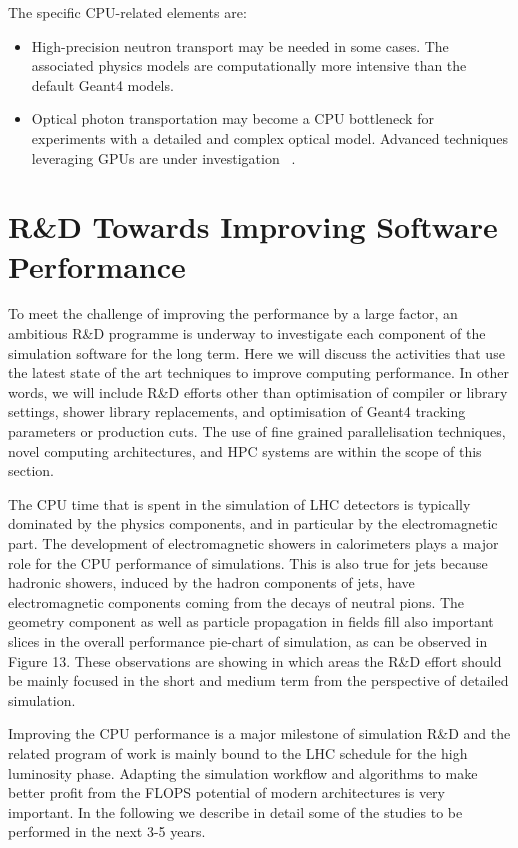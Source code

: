 \documentclass[12pt,a4paper]{article}
\begin{document}
{The specific CPU-related elements are:

\begin{itemize}
\item
  High-precision neutron transport may be needed in some cases. The
  associated physics models are computationally more intensive than the
  default Geant4 models.
\item
  Optical photon transportation may become a CPU bottleneck for
  experiments with a detailed and complex optical model. Advanced
  techniques leveraging GPUs are under investigation ~\cite{1742-6596-898-4-042001}.
\end{itemize}

\hypertarget{rd-towards-improving-software-performance}{%
\section{R\&D Towards Improving Software Performance
}\label{rd-towards-improving-software-performance}}

To meet the challenge of improving the performance by a large factor, an
ambitious R\&D programme is underway to investigate each component of
the simulation software for the long term. Here we will discuss the
activities that use the latest state of the art techniques to improve
computing performance. In other words, we will include R\&D efforts
other than optimisation of compiler or library settings, shower library
replacements, and optimisation of Geant4 tracking parameters or
production cuts. The use of fine grained parallelisation techniques,
novel computing architectures, and HPC systems are within the scope of
this section.

The CPU time that is spent in the simulation of LHC detectors is
typically dominated by the physics components, and in particular by the
electromagnetic part. The development of electromagnetic showers in
calorimeters plays a major role for the CPU performance of simulations.
This is also true for jets because hadronic showers, induced by the
hadron components of jets, have electromagnetic components coming from
the decays of neutral pions. The geometry component as well as particle
propagation in fields fill also important slices in the overall
performance pie-chart of simulation, as can be observed in Figure 13.
These observations are showing in which areas the R\&D effort should be
mainly focused in the short and medium term from the perspective of
detailed simulation.

Improving the CPU performance is a major milestone of simulation R\&D
and the related program of work is mainly bound to the LHC schedule for
the high luminosity phase. Adapting the simulation workflow and
algorithms to make better profit from the FLOPS potential of modern
architectures is very important. In the following we describe in detail
some of the studies to be performed in the next 3-5 years.

}
\end{document}

